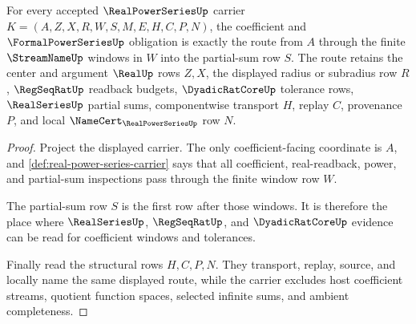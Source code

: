 \begin{theorem}
\label{thm:realpowerseries-coefficient-window-obligation}
For every accepted $\RealPowerSeriesUp$ carrier $K=(A,Z,X,R,W,S,M,E,H,C,P,N)$, the coefficient and $\FormalPowerSeriesUp$ obligation is exactly the route from $A$ through the finite $\StreamNameUp$ windows in $W$ into the partial-sum row $S$. The route retains the center and argument $\RealUp$ rows $Z,X$, the displayed radius or subradius row $R$, $\RegSeqRatUp$ readback budgets, $\DyadicRatCoreUp$ tolerance rows, $\RealSeriesUp$ partial sums, componentwise transport $H$, replay $C$, provenance $P$, and local $\NameCert_{\RealPowerSeriesUp}$ row $N$.
\end{theorem}
\begin{proof}
Project the displayed carrier. The only coefficient-facing coordinate is $A$, and \autoref{def:real-power-series-carrier} says that all coefficient, real-readback, power, and partial-sum inspections pass through the finite window row $W$.

The partial-sum row $S$ is the first row after those windows. It is therefore the place where $\RealSeriesUp$, $\RegSeqRatUp$, and $\DyadicRatCoreUp$ evidence can be read for coefficient windows and tolerances.

Finally read the structural rows $H,C,P,N$. They transport, replay, source, and locally name the same displayed route, while the carrier excludes host coefficient streams, quotient function spaces, selected infinite sums, and ambient completeness.
\end{proof}

